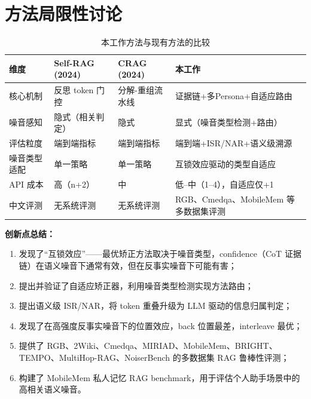 \documentclass[UTF8,zihao=-4]{ctexart}
\begin{document}
\section{方法局限性讨论}

\begin{table}[H]
  \centering
  \caption{本工作方法与现有方法的比较}
  \begin{tabularx}{\textwidth}{lYYY}
    \toprule
    维度 & Self-RAG (2024) & CRAG (2024) & 本工作 \\
    \midrule
    核心机制 & 反思 token 门控 & 分解-重组流水线 & 证据链+多Persona+自适应路由 \\
    噪音感知 & 隐式（相关判定） & 隐式 & 显式（噪音类型检测+路由） \\
    评估粒度 & 端到端指标 & 端到端指标 & 端到端+ISR/NAR+语义级溯源 \\
    噪音类型适配 & 单一策略 & 单一策略 & 互锁效应驱动的类型自适应 \\
    API 成本 & 高（n+2） & 中 & 低--中（1--4），自适应仅+1 \\
    中文评测 & 无系统评测 & 无系统评测 & RGB、Cmedqa、MobileMem 等多数据集评测 \\
    \bottomrule
  \end{tabularx}
\end{table}

\textbf{创新点总结：}
\begin{enumerate}
  \item 发现了“互锁效应”——最优矫正方法取决于噪音类型，confidence（CoT 证据链）在语义噪音下通常有效，但在反事实噪音下可能有害；
  \item 提出并验证了自适应矫正器，利用噪音类型检测实现方法路由；
  \item 提出语义级 ISR/NAR，将 token 重叠升级为 LLM 驱动的信息归属判定；
  \item 发现了在高强度反事实噪音下的位置效应，back 位置最差，interleave 最优；
  \item 提供了 RGB、2Wiki、Cmedqa、MIRIAD、MobileMem、BRIGHT、TEMPO、MultiHop-RAG、NoiserBench 的多数据集 RAG 鲁棒性评测；
  \item 构建了 MobileMem 私人记忆 RAG benchmark，用于评估个人助手场景中的高相关语义噪音。
\end{enumerate}
\end{document}

